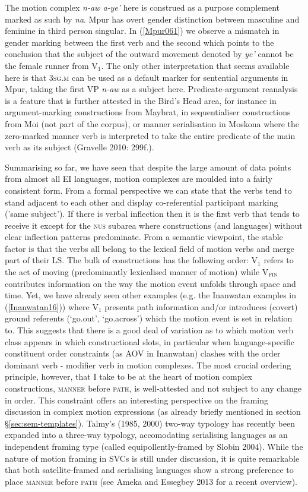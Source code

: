 The motion complex \textit{n-aw a-ye'} here is construed as a purpose complement marked as such by \textit{na}. Mpur has overt gender distinction between masculine and feminine in third person singular. In (\ref{Mpur061}) we observe a mismatch in gender marking between the first verb and the second which points to the conclusion that the subject of the outward movement denoted by \textit{ye'} cannot be the female runner from V$_{1}$. The only other interpretation that seems available here is that \textsc{3sg.m} can be used as a default marker for sentential arguments in Mpur, taking the first VP \textit{n-aw} as a subject here. Predicate-argument reanalysis is a feature that is further attested in the Bird's Head area, for instance in argument-marking constructions from Maybrat, in sequentialiser constructions from Moi (not part of the corpus), or manner serialisation in Moskona where the zero-marked manner verb is interpreted to take the entire predicate of the main verb as its subject (Gravelle 2010: 299f.). 

Summarising so far, we have seen that despite the large amount of data points from almost all EI languages, motion complexes are moulded into a fairly consistent form. From a formal perspective we can state that the verbs tend to stand adjacent to each other and display co-referential participant marking ('same subject'). If there is verbal inflection then it is the first verb that tends to receive it except for the \textsc{nus} subarea where constructions (and languages) without clear inflection patterns predominate. From a semantic viewpoint, the stable factor is that the verbs all belong to the lexical field of motion verbs and merge part of their LS. The bulk of constructions has the following order: V$_{1}$ refers to the act of moving (predominantly lexicalised manner of motion) while V$_{\textsc{fin}}$ contributes information on the way the motion event unfolds through space and time. Yet, we have already seen other examples (e.g. the Inanwatan examples in (\ref{Inanwatan16})) where V$_{1}$ presents path information and/or introduces (covert) ground referents (`go.out', `go.across') which the motion event is set in relation to. This suggests that there is a good deal of variation as to which motion verb class appears in which constructional slots, in particular when language-specific constituent order constraints (as AOV in Inanwatan) clashes with the order dominant verb - modifier verb in motion complexes. The most crucial ordering principle, however, that I take to be at the heart of motion complex constructions, \textsc{manner} before \textsc{path}, is well-attested and not subject to any change in order. This constraint offers an interesting perspective on the framing discussion in complex motion expressions (as already briefly mentioned in section §\ref{sec:sem-templates}). Talmy's (1985, 2000) two-way typology has recently been expanded into a three-way typology, accomodating serialising languages as an independent framing type (called equipollently-framed by Slobin 2004). While the nature of motion framing in SVCs is still under discussion, it is quite remarkable that both satellite-framed and serialising languages show a strong preference to place \textsc{manner} before \textsc{path} (see Ameka and Essegbey 2013 for a recent overview).

